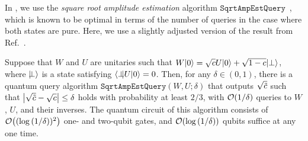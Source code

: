 

In , we use the \emph{square root amplitude estimation} algorithm $\mathtt{SqrtAmpEstQuery}$~\cite{Wang2024OptimalFidelityPure}, which is known to be optimal in terms of the number of queries in the case where both states are pure.
Here, we use a slightly adjusted version of the result from Ref.~\cite{Wang2024OptimalFidelityPure}.

\begin{theorem}
\label{lem:square root amp est query}
Suppose that $W$ and $U$ are unitaries such that $W|0\rangle = \sqrt{c}U|0\rangle + \sqrt{1- c}|\hspace{-1mm}\perp\rangle$,
where $\ket{\hspace{-2mm}\perp}$ is a state satisfying $\bra{\perp\hspace{-2mm}}U\ket{0} = 0$.
Then, for any $\delta \in (0, 1)$, there is a quantum query algorithm $\mathtt{SqrtAmpEstQuery}(W, U; \delta)$ that outputs $\sqrt{\tilde{c}}$ such that $\big|\sqrt{\tilde{c}} - \sqrt{c}\big| \leq \delta$ holds with probability at least $2/3$, with ${\mathcal{O}}(1/\delta)$ queries to $W$, $U$, and their inverses.
The quantum circuit of this algorithm consists of ${\mathcal{O}}\big((\log{(1/\delta)})^2\big)$ one- and two-qubit gates, and ${\mathcal{O}}(\log{(1/\delta)})$ qubits suffice at any one time.
\end{theorem}

